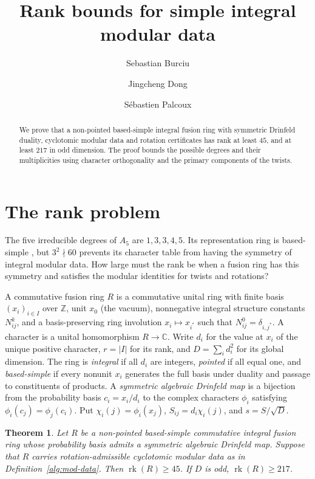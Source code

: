\documentclass[11pt]{amsart}
\title[Rank bounds for simple integral modular data]{Rank bounds for simple integral modular data}
\author{Sebastian Burciu}
\author{Jingcheng Dong}
\author{S\'ebastien Palcoux}
\date{}
\numberwithin{equation}{section}
\theoremstyle{definition}
\theoremstyle{plain}
\newtheorem{mainthm}{Theorem}
\newcommand{\ZZ}{\mathbb Z}
\begin{document}
\begin{abstract}
We prove that a non-pointed based-simple integral fusion ring with symmetric Drinfeld duality, cyclotomic modular data and rotation certificates has rank at least $45$, and at least $217$ in odd dimension. The proof bounds the possible degrees and their multiplicities using character orthogonality and the primary components of the twists.
\end{abstract}
\maketitle

\section{The rank problem}
The five irreducible degrees of $A_5$ are $1,3,3,4,5$. Its representation ring is based-simple \cite[\S5]{LPR}, but $3^2\nmid60$ prevents its character table from having the symmetry of integral modular data. How large must the rank be when a fusion ring has this symmetry and satisfies the modular identities for twists and rotations?

\smallskip\noindent
A commutative fusion ring $R$ is a commutative unital ring with finite
basis $(x_i)_{i\in I}$ over $\ZZ$, unit $x_0$ (the vacuum), nonnegative integral
structure constants $N_{ij}^k$, and a basis-preserving ring involution
$x_i\mapsto x_{i^*}$ such that $N_{ij}^0=\delta_{i,j^*}$.
A character is a unital homomorphism $R\to\mathbb C$. Write $d_i$ for the value at $x_i$ of the unique positive character,
$r=|I|$ for its rank, and $D=\sum_i d_i^2$ for its global dimension.
The ring is \emph{integral} if all $d_i$ are integers, \emph{pointed}
if all equal one, and \emph{based-simple} if every nonunit $x_i$
generates the full basis under duality and passage to constituents of
products. A \emph{symmetric algebraic Drinfeld map} is a bijection
from the probability basis $c_i=x_i/d_i$ to the complex characters
$\phi_i$ satisfying $\phi_i(c_j)=\phi_j(c_i)$. Put
$\chi_i(j)=\phi_i(x_j)$, $S_{ij}=d_i\chi_i(j)$, and $s=S/\sqrt D$.

\begin{mainthm}\label{alg:rank}
Let $R$ be a non-pointed based-simple commutative integral fusion ring whose probability basis admits a symmetric algebraic Drinfeld map. Suppose that $R$ carries rotation-admissible cyclotomic modular data as in Definition~\ref{alg:mod-data}. Then $\operatorname{rk}(R)\ge45$. If $D$ is odd, $\operatorname{rk}(R)\ge217$.
\end{mainthm}
\end{document}
